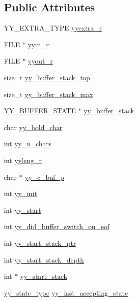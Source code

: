 \subsection*{Public Attributes}
\begin{DoxyCompactItemize}
\item 
YY\_\-EXTRA\_\-TYPE \hyperlink{structyyguts__t_aef05c0d6725a5214f6b30466f0b01c47}{yyextra\_\-r}
\item 
FILE $\ast$ \hyperlink{structyyguts__t_a21f81ca100b12364a5095a37d1c6f650}{yyin\_\-r}
\item 
FILE $\ast$ \hyperlink{structyyguts__t_a436368a905aaf12e809e265749c74031}{yyout\_\-r}
\item 
size\_\-t \hyperlink{structyyguts__t_af92507d904af2fcd4509acde654a9850}{yy\_\-buffer\_\-stack\_\-top}
\item 
size\_\-t \hyperlink{structyyguts__t_a4435bb91e87f9988b096afc21386289a}{yy\_\-buffer\_\-stack\_\-max}
\item 
\hyperlink{structyy__buffer__state}{YY\_\-BUFFER\_\-STATE} $\ast$ \hyperlink{structyyguts__t_ad0b9d576189d518a4482f20ed9b2a416}{yy\_\-buffer\_\-stack}
\item 
char \hyperlink{structyyguts__t_adde3f71374c223bbac47284824996e86}{yy\_\-hold\_\-char}
\item 
int \hyperlink{structyyguts__t_a99c9218941829a6662d358422fd4184a}{yy\_\-n\_\-chars}
\item 
int \hyperlink{structyyguts__t_aba739bc731f0e9cbb0b6bdfca7930ebd}{yyleng\_\-r}
\item 
char $\ast$ \hyperlink{structyyguts__t_ab1b9bcacb33aab1e02b625512bc0e221}{yy\_\-c\_\-buf\_\-p}
\item 
int \hyperlink{structyyguts__t_abbef56b2d8359f6a15629c104f5dd030}{yy\_\-init}
\item 
int \hyperlink{structyyguts__t_a8baf7d47fe53035d9bc2a9670795ff01}{yy\_\-start}
\item 
int \hyperlink{structyyguts__t_a2daec411627700709ef2fd927e69627d}{yy\_\-did\_\-buffer\_\-switch\_\-on\_\-eof}
\item 
int \hyperlink{structyyguts__t_ad9e132dacc2904a8ae76c64c72e33795}{yy\_\-start\_\-stack\_\-ptr}
\item 
int \hyperlink{structyyguts__t_a35bedf1c17debd766565b99c39132eb4}{yy\_\-start\_\-stack\_\-depth}
\item 
int $\ast$ \hyperlink{structyyguts__t_af6e2e45a5fdba0f313c680b35da4292a}{yy\_\-start\_\-stack}
\item 
\hyperlink{scanner_8c_a9ba7c416f135b0f0c1f4addded4616b5}{yy\_\-state\_\-type} \hyperlink{structyyguts__t_a84e01a3658729e9d69f79feb3faf1c99}{yy\_\-last\_\-accepting\_\-state}

\end{DoxyCompactItemize}
